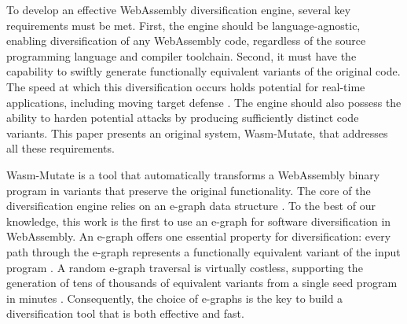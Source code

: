 \documentclass[a4paper,fleqn]{cas-dc}
\newcommand*\badge[1]{ \colorbox{red}{\color{white}#1}}
\newcommand{\tool}{{\sc Wasm-Mutate}\xspace}
\newcommand{\Wasm}{WebAssembly\xspace}
\newcommand{\wasm}{\Wasm}
\newcommand{\todo}[1]{%
\refstepcounter{todo}
\noindent\textbf{\badge{TODO}} {\color{red}#1}
\addcontentsline{td}{todo}
{\color{red}\thesection.\thetodo\xspace #1}}
\begin{document}
To develop an effective \wasm diversification engine, several key requirements must be met. 
First, the engine should be language-agnostic, enabling diversification of any \Wasm code, regardless of the source programming language and compiler toolchain.
Second, it must have the capability to swiftly generate functionally equivalent variants of the original code. 
The speed at which this diversification occurs holds potential for real-time applications, including  moving target defense \cite{MEWE}. 
The engine should also possess the ability to harden potential attacks by producing sufficiently distinct code variants.
This paper presents an original system, \tool, that addresses all these requirements.

\tool is a tool that automatically transforms a \wasm binary program in variants that preserve the original functionality. 
The core of the diversification engine relies on an e-graph data structure \cite{10.1145/3434304}.
To the best of our knowledge, this work is the first to use an e-graph  for software diversification in \Wasm. An e-graph offers one essential property for diversification:  every path through the e-graph represents a functionally equivalent variant of the input program \cite{10.1145/3434304, 10.1145/3385412.3386001}.  
A random e-graph traversal is virtually costless, supporting the generation of tens of thousands of equivalent variants from a single seed program in minutes \cite{10.1145/3547622}. 
Consequently, the choice of e-graphs is the key to build a diversification tool that is both effective and fast.
\end{document}
